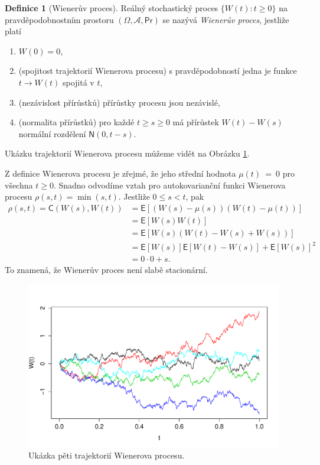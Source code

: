 \documentclass[a4paper,12pt]{report}
\theoremstyle{definition} \newtheorem{definice}[veta]{Definice}
\theoremstyle{remark}
\begin{document}
\begin{definice}[Wienerův proces]\label{WP_def}
Reálný stochastický proces $\{W(t):t\ge0\}$ na pravděpodobnostním prostoru $(\Omega,\mathcal{A},\mathsf{Pr})$ se nazývá \textit{Wienerův proces}, jestliže platí
\begin{enumerate}
\item$W(0)=0$, 
\item(spojitost trajektorií Wienerova procesu) s pravděpodobností jedna je funkce $t\to W(t)$ spojitá v $t$,
\item(nezávislost přírůstků) přírůstky procesu jsou nezávislé,
\item(normalita přírůstků) pro každé $t\ge s\ge0$ má přírůstek $W(t)-W(s)$ normální rozdělení $\mathsf{N}(0, t-s)$.
\end{enumerate}
\end{definice}

Ukázku trajektorií Wienerova procesu můžeme vidět na Obrázku \ref{WP_graf}.

Z definice Wienerova procesu je zřejmé, že jeho střední hodnota $\mu(t)~=~0$ pro všechna $t\ge0$.
Snadno odvodíme vztah pro autokovarianční funkci Wienerova procesu $\rho(s,t)=\min(s,t)$.
Jestliže $0\leq s<t$, pak
\begin{align*}
\rho(s,t)=\mathsf{C}(W(s),W(t))&=\mathsf{E}{\left[(W(s)-\mu(s))(W(t)-\mu(t))\right]} \\
&=\mathsf{E}{\left[W(s)W(t)\right]}  \\
&=\mathsf{E}{\left[W(s)(W(t)-W(s)+W(s))\right]} \\
&=\mathsf{E}{\left[W(s)\right]}\mathsf{E}{\left[W(t)-W(s)\right]}+\mathsf{E}{\left[W(s)\right]}^2 \\
&=0\cdot0+s.
\end{align*}
To znamená, že Wienerův proces není slabě stacionární.

\begin{figure}[!htbp]
  \centering 
	\includegraphics[width=13.5cm, clip, trim= 0 15 25 40]{IMG/WP_v2.pdf}
  \caption{Ukázka pěti trajektorií Wienerova procesu.}  \label{WP_graf}
\end{figure}
\end{document}
